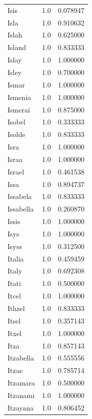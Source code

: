 \documentclass[
  letterpaper,
  DIV=11,
  numbers=noendperiod]{scrreprt}
\begin{document}
\begin{tabular}{lrr}
Isis            &   1.0 &   0.078947 \\
Isla            &   1.0 &   0.910632 \\
Islah           &   1.0 &   0.625000 \\
Island          &   1.0 &   0.833333 \\
Islay           &   1.0 &   1.000000 \\
Isley           &   1.0 &   0.700000 \\
Ismar           &   1.0 &   1.000000 \\
Ismenia         &   1.0 &   1.000000 \\
Ismerai         &   1.0 &   0.875000 \\
Isobel          &   1.0 &   0.333333 \\
Isolde          &   1.0 &   0.833333 \\
Isra            &   1.0 &   1.000000 \\
Israa           &   1.0 &   1.000000 \\
Israel          &   1.0 &   0.461538 \\
Issa            &   1.0 &   0.894737 \\
Issabela        &   1.0 &   0.833333 \\
Issabella       &   1.0 &   0.260870 \\
Issis           &   1.0 &   1.000000 \\
Isys            &   1.0 &   1.000000 \\
Isyss           &   1.0 &   0.312500 \\
Italia          &   1.0 &   0.459459 \\
Italy           &   1.0 &   0.692308 \\
Itati           &   1.0 &   0.500000 \\
Itcel           &   1.0 &   1.000000 \\
Ithzel          &   1.0 &   0.833333 \\
Itsel           &   1.0 &   0.357143 \\
Itxel           &   1.0 &   1.000000 \\
Itza            &   1.0 &   0.857143 \\
Itzabella       &   1.0 &   0.555556 \\
Itzae           &   1.0 &   0.785714 \\
Itzamara        &   1.0 &   0.500000 \\
Itzanami        &   1.0 &   1.000000 \\
Itzayana        &   1.0 &   0.806452 \\

\end{tabular}
\end{document}
